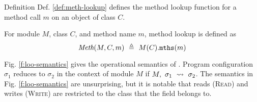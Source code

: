 Definition Def. \ref{def:meth-lookup} defines the method lookup function for a method
call $m$ on an object of class $C$.
\begin{definition}
\label{def:meth-lookup}
For module $M$, class $C$, and method name $m$, method lookup is defined as 
$$\meth{M}{C}{m}\ \triangleq\ M(C).\texttt{mths}(m)$$
\end{definition}

Fig. \ref{f:loo-semantics} gives the operational semantics of \Loo. 
Program configuration $\sigma_1$ reduces to $\sigma_2$ in the context of
module $M$ if $M,\ \sigma_1\ \leadsto\ \sigma_2$. The semantics in Fig. \ref{f:loo-semantics}
are unsurprising, but it is notable that reads (\textsc{Read}) and writes (\textsc{Write})
are restricted to the class that the field belongs to.
\begin{figure}[t]
\begin{minipage}{\textwidth}
\begin{minipage}{\textwidth}
\footnotesize
{}
\end{minipage}
\end{minipage}
\end{figure}
